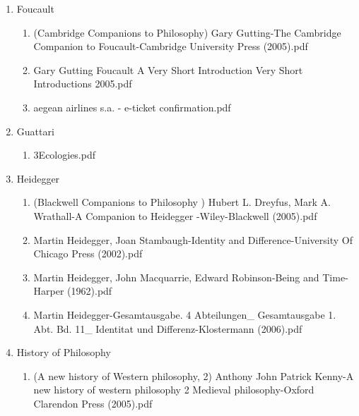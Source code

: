 \documentclass[11pt]{article}
\begin{document}
\begin{enumerate}
\item Foucault
\label{sec-1-1-1-1-34-36}
\begin{enumerate}
\item (Cambridge Companions to Philosophy) Gary Gutting-The Cambridge Companion to Foucault-Cambridge University Press (2005).pdf
\label{sec-1-1-1-1-34-36-1}

\item Gary Gutting Foucault A Very Short Introduction Very Short Introductions  2005.pdf
\label{sec-1-1-1-1-34-36-2}

\item aegean airlines s.a. - e-ticket confirmation.pdf
\label{sec-1-1-1-1-34-36-3}
\end{enumerate}

\item Guattari
\label{sec-1-1-1-1-34-37}
\begin{enumerate}
\item 3Ecologies.pdf
\label{sec-1-1-1-1-34-37-1}
\end{enumerate}

\item Heidegger
\label{sec-1-1-1-1-34-38}
\begin{enumerate}
\item (Blackwell Companions to Philosophy ) Hubert L. Dreyfus, Mark A. Wrathall-A Companion to Heidegger -Wiley-Blackwell (2005).pdf
\label{sec-1-1-1-1-34-38-1}

\item Martin Heidegger, Joan Stambaugh-Identity and Difference-University Of Chicago Press (2002).pdf
\label{sec-1-1-1-1-34-38-2}

\item Martin Heidegger, John Macquarrie, Edward Robinson-Being and Time-Harper (1962).pdf
\label{sec-1-1-1-1-34-38-3}

\item Martin Heidegger-Gesamtausgabe. 4 Abteilungen\_ Gesamtausgabe 1. Abt. Bd. 11\_ Identitat und Differenz-Klostermann (2006).pdf
\label{sec-1-1-1-1-34-38-4}
\end{enumerate}

\item History of Philosophy
\label{sec-1-1-1-1-34-39}
\begin{enumerate}
\item (A new history of Western philosophy, 2) Anthony John Patrick Kenny-A new history of western philosophy 2 Medieval philosophy-Oxford Clarendon Press (2005).pdf
\label{sec-1-1-1-1-34-39-1}


\end{enumerate}
\end{enumerate}
\end{document}
